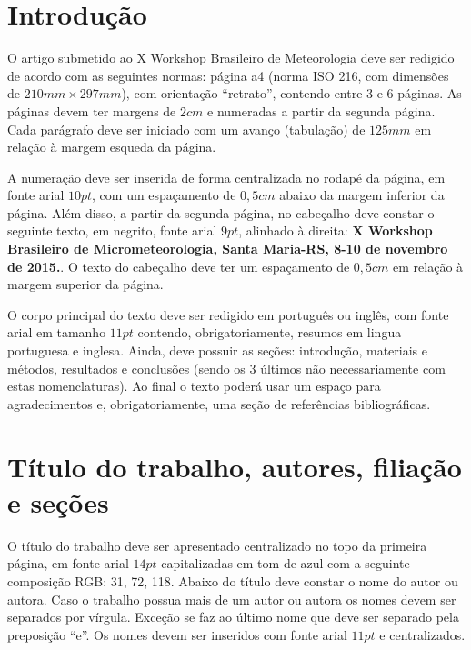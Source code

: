\documentclass[]{workmicro2017} %
\affil[1]{Curso de Graduação em Meteorologia, UFPEL}
\affil[2]{Curso de Graduação em Meteorologia, UFSC}
\affil[3]{Curso Técnico em Meteorologia, IFSC}
\affil[4]{Departamento de Física, UFSM}
\begin{document}

\corpo  %


\section{Introdução}

\par O artigo submetido ao X Workshop Brasileiro de Meteorologia deve ser redigido de acordo com as seguintes normas: página a4 (norma ISO 216, com dimensões de $210mm\times297mm$), com orientação ``retrato'', contendo entre 3 e 6 páginas. As páginas devem ter margens de $2cm$ e numeradas a partir da segunda página. Cada parágrafo deve ser iniciado com um avanço (tabulação) de $125mm$ em relação à margem esqueda da página.

\par A numeração deve ser inserida de forma centralizada no rodapé da página, em fonte arial $10pt$, com um espaçamento de $0,5cm$ abaixo da margem inferior da página. Além disso, a partir da segunda página, no cabeçalho deve constar o seguinte texto, em negrito, fonte arial $9pt$, alinhado à direita: \textbf{X Workshop Brasileiro de Micrometeorologia, Santa Maria-RS, 8-10 de novembro de 2015.}. O texto do cabeçalho deve ter um espaçamento de $0,5cm$ em relação à margem superior da página.

\par O corpo principal do texto deve ser redigido em português ou inglês, com fonte arial em tamanho $11pt$ contendo, obrigatoriamente, resumos em lingua portuguesa e inglesa. Ainda, deve possuir as seções: introdução, materiais e métodos, resultados e conclusões (sendo os 3 últimos não necessariamente com estas nomenclaturas). Ao final o texto poderá usar um espaço para agradecimentos e, obrigatoriamente, uma seção de referências bibliográficas.



\section{Título do trabalho, autores, filiação e seções}

\par O título do trabalho deve ser apresentado centralizado no topo da primeira página, em fonte arial $14pt$ capitalizadas em tom de azul com a seguinte composição RGB: 31, 72, 118. Abaixo do título deve constar o nome do autor ou autora. Caso o trabalho possua mais de um autor ou autora os nomes devem ser separados por vírgula. Exceção se faz ao último nome que deve ser separado pela preposição ``e''. Os nomes devem ser inseridos com fonte arial $11pt$ e centralizados.
\end{document}
